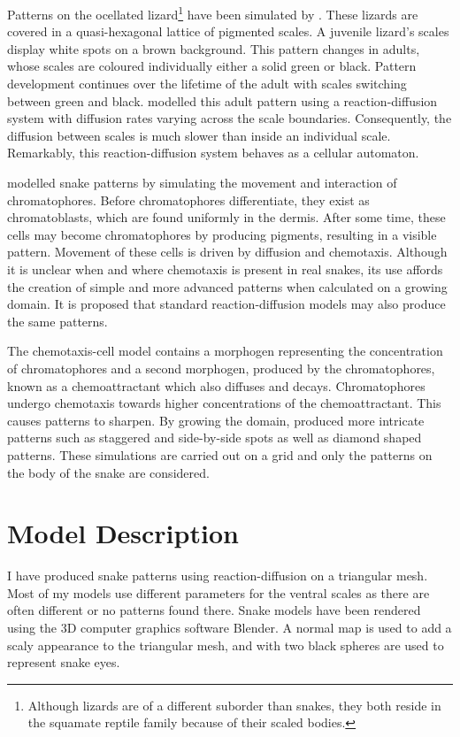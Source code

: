 Patterns on the ocellated lizard\footnote{Although lizards are of a different suborder than snakes, they both reside in the squamate reptile family because of their scaled bodies.} have been simulated by \citet{manukyan2017}. These lizards are covered in a quasi-hexagonal lattice of pigmented scales. A juvenile lizard's scales display white spots on a brown background. This pattern changes in adults, whose scales are coloured individually either a solid green or black. Pattern development continues over the lifetime of the adult with scales switching between green and black. \citet{manukyan2017} modelled this adult pattern using a reaction-diffusion system with diffusion rates varying across the scale boundaries. Consequently, the diffusion between scales is much slower than inside an individual scale. Remarkably, this reaction-diffusion system behaves as a cellular automaton.

\citet{MURRAY1991} modelled snake patterns by simulating the movement and interaction of chromatophores. Before chromatophores differentiate, they exist as chromatoblasts, which are found uniformly in the dermis. After some time, these cells may become chromatophores by producing pigments, resulting in a visible pattern. Movement of these cells is driven by diffusion and chemotaxis. Although it is unclear when and where chemotaxis is present in real snakes, its use affords the creation of simple and more advanced patterns when calculated on a growing domain. It is proposed that standard reaction-diffusion models may also produce the same patterns.

The chemotaxis-cell model contains a morphogen representing the concentration of chromatophores and a second morphogen, produced by the chromatophores, known as a chemoattractant which also diffuses and decays. Chromatophores undergo chemotaxis towards higher concentrations of the chemoattractant. This  causes patterns to sharpen. By growing the domain, \citet{MURRAY1991} produced more intricate patterns such as staggered and side-by-side spots as well as diamond shaped patterns. These simulations are carried out on a grid and only the patterns on the body of the snake are considered.

\section{Model Description}
I have produced snake patterns using reaction-diffusion on a triangular mesh. Most of my models use different parameters for the ventral scales as there are often different or no patterns found there. Snake models have been rendered using the 3D computer graphics software Blender. A normal map is used to add a scaly appearance to the triangular mesh, and with two black spheres are used to represent snake eyes.


